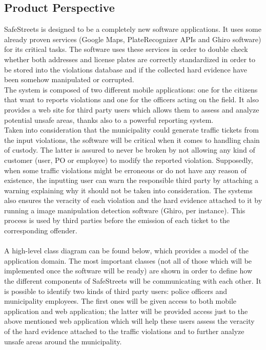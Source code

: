\documentclass{article}
\begin{document}
\subsection{Product Perspective}
SafeStreets is designed to be a completely new software applications. It uses
some already proven services (Google Maps, PlateRecognizer APIs and Ghiro
software) for its critical tasks. The software uses these services in order to
double check whether both addresses and license plates are correctly
standardized in order to be stored into the violations database and if the
collected hard evidence have been somehow manipulated or corrupted.\\
The system is composed of two different mobile applications: one for the
citizens that want to reports violations and one for the officers acting on the
field. It also provides a web site for third party users which allows them to
assess and analyze potential unsafe areas, thanks also to a powerful reporting
system.\\
Taken into consideration that the municipality could generate traffic tickets
from the input violations, the software will be critical when it comes to
handling chain of custody. The latter is assured to never be broken by not
allowing any kind of customer (user, PO or employee) to modify the reported
violation. Supposedly, when some traffic violations might be erroneous or do not
have any reason of existence, the inputting user can warn the responsible third
party by attaching a warning explaining why it should not be taken into
consideration. The systems also ensures the veracity of each violation and the
hard evidence attached to it by running a image manipulation detection software
(Ghiro, per instance). This process is used by third parties before the emission
of each ticket to the corresponding offender.\\
\\
A high-level class diagram can be found below, which provides a model of the
application domain. The most important classes (not all of those which will be
implemented once the software will be ready) are shown in order to define how
the different components of SafeStreets will be communicating with each other.
It is possible to identify two kinds of third party users: police officers and
municipality employees. The first ones will be given access to both mobile
application and web application; the latter will be provided access just to the
above mentioned web application which will help these users assess the veracity
of the hard evidence attached to the traffic violations and to further analyze
unsafe areas around the municipality.\\
\end{document}
